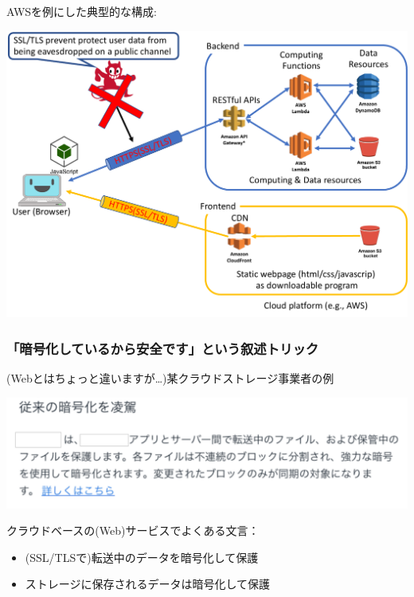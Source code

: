 \documentclass[12pt,dvipdfmx]{beamer}
\begin{document}
\begin{frame}
AWSを例にした典型的な構成:
\begin{center}
\includegraphics[width=0.85\linewidth]{Figs/spa2.pdf}
\end{center}
\end{frame}


\begin{frame}
\frametitle{「暗号化しているから安全です」という叙述トリック}

\begin{block}{\small (Webとはちょっと違いますが…)某クラウドストレージ事業者の例}
\begin{center}
\includegraphics[width=0.8\linewidth]{Figs/storage_enc.pdf}
\end{center} 
\end{block}

クラウドベースの(Web)サービスでよくある文言：
\begin{itemize}
 \item (SSL/TLSで)転送中のデータを暗号化して保護
 \item ストレージに保存されるデータは暗号化して保護
\end{itemize}
\end{frame}
\end{document}
